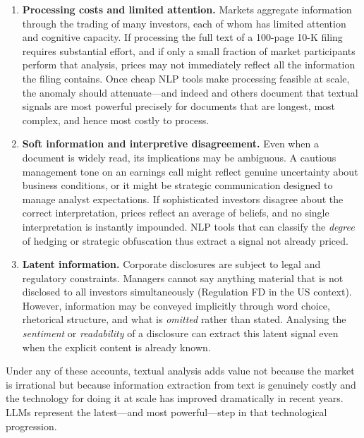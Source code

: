 \begin{context}
\begin{enumerate}
  \item \textbf{Processing costs and limited attention.} Markets aggregate information
    through the trading of many investors, each of whom has limited attention and
    cognitive capacity.  If processing the full text of a 100-page 10-K filing
    requires substantial effort, and if only a small fraction of market participants
    perform that analysis, prices may not immediately reflect all the information the
    filing contains.  Once cheap NLP tools make processing feasible at scale, the
    anomaly should attenuate---and indeed \citet{li2013measuring} %
    and others document that textual signals are most powerful precisely for documents
    that are longest, most complex, and hence most costly to process.

  \item \textbf{Soft information and interpretive disagreement.} Even when a document is
    widely read, its implications may be ambiguous.  A cautious management tone on an
    earnings call might reflect genuine uncertainty about business conditions, or it might
    be strategic communication designed to manage analyst expectations.  If sophisticated
    investors disagree about the correct interpretation, prices reflect an average of
    beliefs, and no single interpretation is instantly impounded.  NLP tools that can
    classify the \emph{degree} of hedging or strategic obfuscation thus extract a signal
    not already priced.

  \item \textbf{Latent information.} Corporate disclosures are subject to legal and
    regulatory constraints.  Managers cannot say anything material that is not disclosed
    to all investors simultaneously (Regulation FD in the US context).  However,
    information may be conveyed implicitly through word choice, rhetorical structure, and
    what is \emph{omitted} rather than stated.  Analysing the \emph{sentiment} or
    \emph{readability} of a disclosure can extract this latent signal even when the
    explicit content is already known.
\end{enumerate}

Under any of these accounts, textual analysis adds value not because the market is
irrational but because information extraction from text is genuinely costly and the
technology for doing it at scale has improved dramatically in recent years.  LLMs
represent the latest---and most powerful---step in that technological progression.


\end{context}
